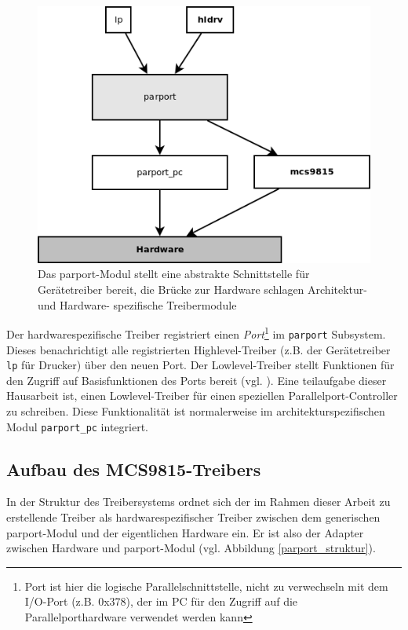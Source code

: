 \documentclass[a4paper,11pt]{article}
\begin{document}
\begin{figure}[h!]
 \centering
 \includegraphics[scale=0.7,bb=0 0 493 380]{./pics/parport_struktur.png}
 \caption{Das parport-Modul stellt eine abstrakte Schnittstelle für Gerätetreiber bereit, die Brücke zur Hardware schlagen Architektur- und Hardware-
spezifische Treibermodule}
\label{fig:parport_struktur}
\end{figure}
\newpage
\noindent
Der hardwarespezifische Treiber registriert einen \emph{Port}\footnote{Port ist hier die logische Parallelschnittstelle, nicht zu verwechseln
mit dem I/O-Port (z.B. 0x378), der im PC für den Zugriff auf die Parallelporthardware verwendet werden kann} 
im \verb|parport| Subsystem. 
Dieses benachrichtigt alle registrierten Highlevel-Treiber (z.B. der Gerätetreiber \verb|lp| für Drucker) über den neuen Port. Der Lowlevel-Treiber stellt
Funktionen für den Zugriff auf Basisfunktionen des Ports bereit (vgl. \cite{net:1}).
\noindent
Eine teilaufgabe dieser Hausarbeit ist, einen Lowlevel-Treiber für einen speziellen Parallelport-Controller zu schreiben. Diese 
Funktionalität ist normalerweise im architekturspezifischen Modul \verb|parport_pc| integriert.

\subsection{Aufbau des MCS9815-Treibers}

In der Struktur des Treibersystems ordnet sich der im Rahmen dieser Arbeit zu erstellende Treiber als hardwarespezifischer Treiber
zwischen dem generischen parport-Modul und der eigentlichen Hardware ein. Er ist also der Adapter zwischen Hardware und parport-Modul 
(vgl. Abbildung \ref{parport_struktur}).
\end{document}
